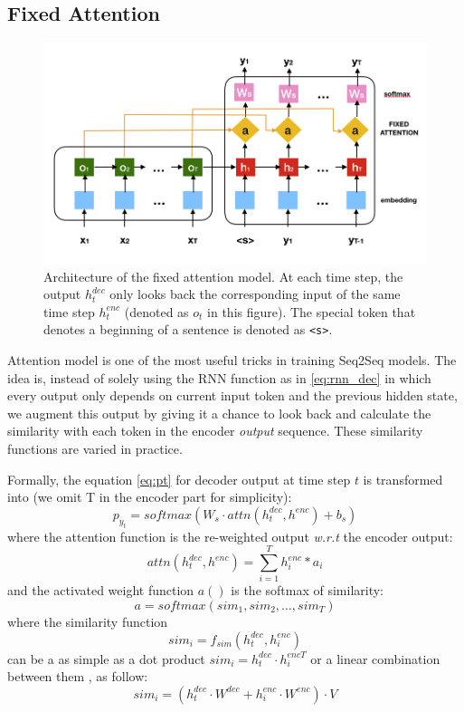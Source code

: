 \documentclass[11pt,a4paper]{article}
\begin{document}
\subsection{Fixed Attention}
\begin{figure}[ht]
\centering
\includegraphics[width=0.9\linewidth]{fixed_attention}
\caption{Architecture of the fixed attention model. At each time step, the output $h^{dec}_t$ only looks back the corresponding input of the same time step $h^{enc}_t$ (denoted as $o_t$ in this figure). The special token that denotes a beginning of a sentence is denoted as \texttt{<s>}.}
\label{fig:attention}
\end{figure}
Attention model \cite{bahdanau2014neural,luong2015effective} is one of the most useful tricks in training Seq2Seq models. The idea is, instead of solely using the RNN function as in \ref{eq:rnn_dec} in which every output only depends on current input token and the previous hidden state, we augment this output by giving it a chance to look back and calculate the similarity with each token in the encoder \textit{output} sequence. These similarity functions are varied in practice. 

Formally, the equation \ref{eq:pt} for decoder output at time step $t$ is transformed into (we omit T in the encoder part for simplicity): 
  \begin{equation}
      p_{y_t} = softmax(W_{s} \cdot attn(h^{dec}_t, h^{enc}) + b_{s}) \label{eq:pt_attn}
  \end{equation}
where the attention function is the re-weighted output \textit{w.r.t} the encoder output: 
  \begin{equation}
	  attn(h^{dec}_t, h^{enc}) = \sum^{T}_{i=1} h^{enc}_i * a_i \label{eq:attn}
  \end{equation}
and the activated weight function $a()$ is the softmax of similarity: 
  \begin{equation}
	  a = softmax(sim_1, sim_2, \dots, sim_T) \label{eq:a}
  \end{equation}
where the similarity function
  \begin{equation}
	sim_i = f_{sim}(h^{dec}_t, h^{enc}_i)
  \end{equation}
can be a as simple as a dot product $sim_i = h^{dec}_t \cdot h^{encT}_i $ \cite{luong2015effective} or a linear combination between them \cite{bahdanau2014neural}, as follow:  
  \begin{equation}
  	sim_i = (h^{dec}_t \cdot W^{dec} + h^{enc}_i \cdot W^{enc}) \cdot V
  \end{equation}
  
\end{document}
